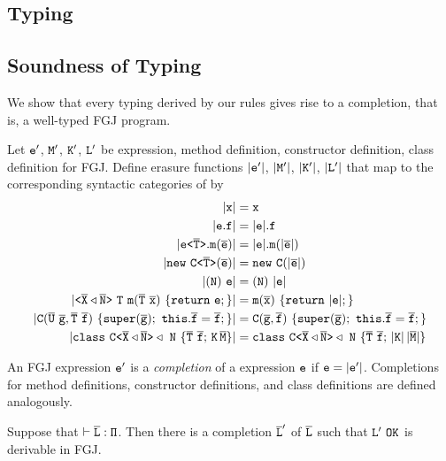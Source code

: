 
\subsection{Typing}
\label{chapter:type-rules}


\subsection{Soundness of Typing}
\label{sec:soundness-typing}

We show that every typing derived by our \TFGJ rules gives rise to a
completion, that is, a well-typed FGJ program.
\begin{definition}[Erasure]
  Let ${\tt e}'$, ${\tt M}'$, ${\tt K}'$, ${\tt L}'$ be expression, method definition, constructor definition, class definition for FGJ. Define erasure functions 
  $|{\tt e}'|$, $|{\tt M}'|$, $|{\tt K}'|$, $|{\tt L}'|$ that map to the corresponding syntactic categories of \TFGJ by
  \begin{align*}
    \Erase{\mv x} &= \mv x \\
    \Erase{\mv e.\mv f} &= \Erase{\mv e}.\mv f \\
    \Erase{\exptype{e}{\ol T}.\mathtt{m}(\ol{e})} &= \Erase{\mv e}. \mathtt{m} (\Erase{\ol e}) \\
    \Erase{\mathtt{new}\ \exptype{C}{\ol T}(\ol{e})} & = \mathtt{new}\ \mv{C}(\Erase{\ol{e}}) \\
    \Erase{(\mv N)\ \mv e} & = (\mv N)\ \Erase{\mv e} \\
    \Erase{\exptype{}{\ol{X} \triangleleft \ol{N}}\ \mv{T}\ \mathtt{m}(\ol T\ \ol{x})\ \{ \mathtt{
    return}\ \mv e; \}} & = \mathtt{m}(\ol{x})\ \{ \mathtt{ return}\ \Erase{\mv e}; \} \\
    \Erase{\mv C(\ol{U}\ \ol{g}, \ol{T}\ \ol{f})\ \{\mathtt{super}(\ol{g}); \ \mathtt{this}.\ol{f}=\ol{f};\}} & = \mv C(\ol{g}, \ol{f})\ \{\mathtt{super}(\ol{g}); \ \mathtt{this}.\ol{f}=\ol{f};\} \\
    \Erase{\mathtt{class} \ \exptype{C}{\ol{X} \triangleleft \ol{N}} \triangleleft \ \mv N\ \{ \ol{T} \ \ol{f}; \,\mv K \, \ol{M} \}} & = 
    \mathtt{class} \ \exptype{C}{\ol{X} \triangleleft \ol{N}} \triangleleft \ \mv N\ \{ \ol{T} \ \ol{f}; \,\Erase{\mv K} \, \Erase{\ol{M}} \}
  \end{align*}
\end{definition}
\begin{definition}[Completion]
  An FGJ expression ${\tt e}'$ is a \emph{completion} of a \TFGJ expression ${\tt e}$ if ${\tt e} = |{\tt e}'|$. Completions for method definitions, constructor definitions, and class definitions
  are defined analogously.
\end{definition}
\begin{theorem}
  Suppose that $\mathtt{\vdash \overline{\tt L} : \Pi}$. Then there is a completion $\overline{\tt L}'$ of $\overline{\tt L}$ such that $\mv{L}'\ \mathtt{OK}$ is derivable in FGJ.
\end{theorem}


